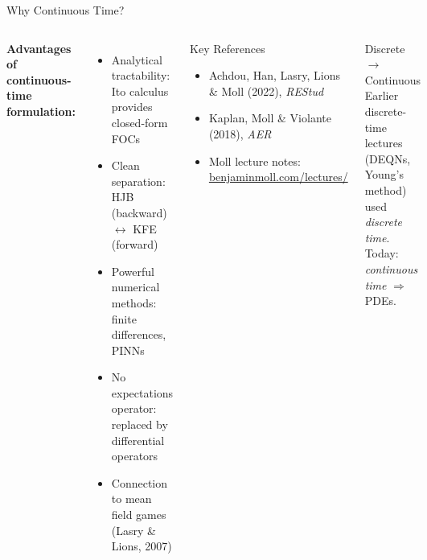 \documentclass[aspectratio=169,11pt]{beamer}
\newcommand{\emphc}[1]{\textcolor{harvardcrimson}{#1}}
\begin{document}
\begin{frame}{Why Continuous Time?}
\begin{columns}[T]
\textbf{Advantages of continuous-time formulation:}
\begin{itemize}\itemsep2pt
    \item \emphc{Analytical tractability}: Ito calculus provides closed-form FOCs
    \item \emphc{Clean separation}: HJB (backward) $\leftrightarrow$ KFE (forward)
    \item \emphc{Powerful numerical methods}: finite differences, PINNs
    \item \emphc{No expectations operator}: replaced by differential operators
    \item \emphc{Connection to mean field games} (Lasry \& Lions, 2007)
\end{itemize}

\begin{block}{Key References}
\small
\begin{itemize}\itemsep2pt
    \item Achdou, Han, Lasry, Lions \& Moll (2022), \emph{REStud}
    \item Kaplan, Moll \& Violante (2018), \emph{AER}
    \item Moll lecture notes:\\ \url{benjaminmoll.com/lectures/}
\end{itemize}
\end{block}

\vspace{0.3em}
\begin{alertblock}{\small Discrete $\to$ Continuous}
\small
Earlier discrete-time lectures (DEQNs, Young's method) used \emph{discrete time}.\\
Today: \emph{continuous time} $\Rightarrow$ PDEs.
\end{alertblock}
\end{columns}
\end{frame}
\end{document}
